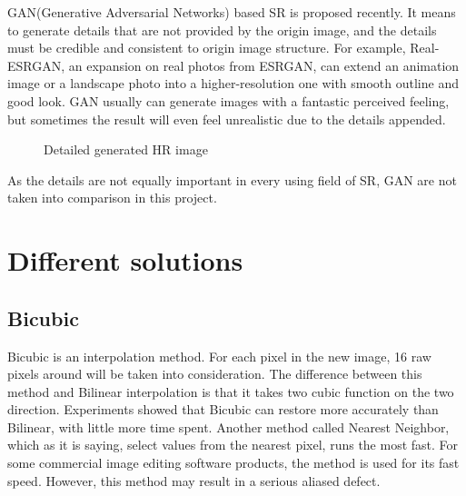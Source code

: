 \documentclass[10pt,twocolumn,letterpaper]{article}
\begin{document}
GAN(Generative Adversarial Networks) based SR is proposed recently. 
It means to generate details that are not provided by the origin image, and the details must be credible and consistent to origin image structure.
For example, Real-ESRGAN\cite{5}, an expansion on real photos from ESRGAN, can extend an animation image or a landscape photo into a higher-resolution one with smooth outline and good look.
GAN usually can generate images with a fantastic perceived feeling, but sometimes the result will even feel unrealistic due to the details appended.

\begin{figure}[H]
    \centering
    \caption{Detailed generated HR image}
\end{figure}
As the details are not equally important in every using field of SR, GAN are not taken into comparison in this project.




\section{Different solutions} 
\subsection{Bicubic}
Bicubic is an interpolation method. For each pixel in the new image, 16 raw pixels around will be taken into consideration.
The difference between this method and Bilinear interpolation is that it takes two cubic function on the two direction.
Experiments showed that Bicubic can restore more accurately than Bilinear, with little more time spent.
Another method called Nearest Neighbor, which as it is saying, select values from the nearest pixel, runs the most fast.
For some commercial image editing software products, the method is used for its fast speed. However, this method may result in a serious aliased defect.
\end{document}
